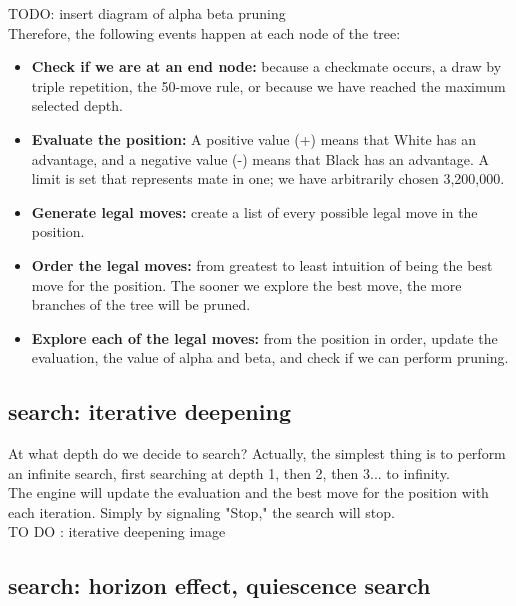 TODO: insert diagram of alpha beta pruning\\

Therefore, the following events happen at each node of the tree:\\

\begin{itemize}
    \item \textbf{Check if we are at an end node:} because a checkmate occurs, a draw by triple repetition, the 50-move rule, or because we have reached the maximum selected depth.
    
    \item \textbf{Evaluate the position:} A positive value (+) means that White has an advantage, and a negative value (-) means that Black has an advantage. A limit is set that represents mate in one; we have arbitrarily chosen 3,200,000.
    
    \item \textbf{Generate legal moves:} create a list of every possible legal move in the position.
    
    \item \textbf{Order the legal moves:} from greatest to least intuition of being the best move for the position. The sooner we explore the best move, the more branches of the tree will be pruned.
    
    \item \textbf{Explore each of the legal moves:} from the position in order, update the evaluation, the value of alpha and beta, and check if we can perform pruning.
\end{itemize}

\subsection{search: iterative deepening}

At what depth do we decide to search? Actually, the simplest thing is to perform\\
an infinite search, first searching at depth 1, then 2, then 3... to infinity.\\
The engine will update the evaluation and the best move for the position with\\
each iteration. Simply by signaling "Stop," the search will stop.\\

TO DO : iterative deepening image\\

\subsection{search: horizon effect, quiescence search}

